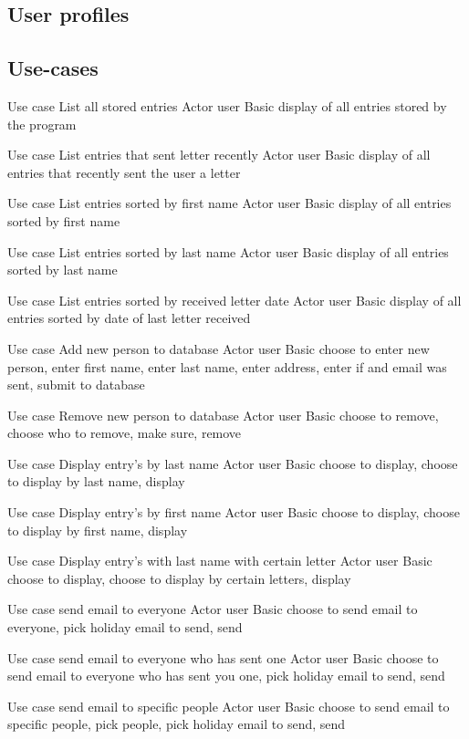 \documentclass{article}
\begin{document}
\subsection{User profiles}


\subsection{Use-cases}
Use case List all stored entries
Actor user
Basic display of all entries stored by the program

Use case List entries that sent letter recently
Actor user
Basic display of all entries that recently sent the user a letter

Use case List entries sorted by first name
Actor user
Basic display of all entries sorted by first name

Use case List entries sorted by last name
Actor user
Basic display of all entries sorted by last name

Use case List entries sorted by received letter date
Actor user
Basic display of all entries sorted by date of last letter received

Use case Add new person to database
Actor user
Basic choose to enter new person, enter first name, enter last name, enter address, enter if and email was sent, submit to database

Use case Remove new person to database
Actor user
Basic choose to remove, choose who to remove, make sure, remove
 
Use case Display entry’s by last name
Actor user
Basic choose to display, choose to display by last name, display
 
Use case Display entry’s by first name
Actor user
Basic choose to display, choose to display by first name, display
 
Use case Display entry’s with last name with certain letter
Actor user
Basic choose to display, choose to display by certain letters, display
 
Use case send email to everyone
Actor user
Basic choose to send email to everyone, pick holiday email to send, send
 
Use case send email to everyone who has sent one
Actor user
Basic choose to send email to everyone who has sent you one, pick holiday email to send, send
 
Use case send email to specific people
Actor user
Basic choose to send email to specific people, pick people, pick holiday email to send, send
\end{document}
